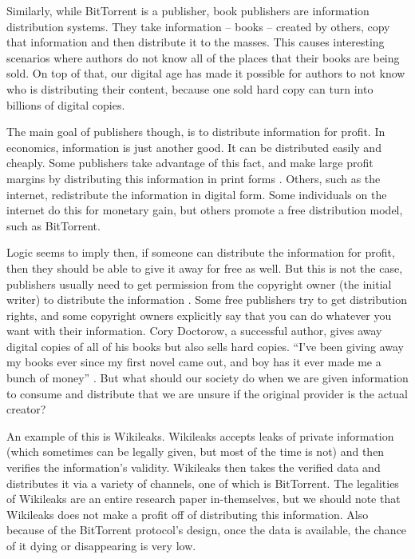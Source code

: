 \documentclass[11pt]{article}
\begin{document}
\begin{multicols}{2}
Similarly, while BitTorrent is a publisher, book publishers are information distribution systems. They take information -- books -- created by others, copy that information and then distribute it to the masses. This causes interesting scenarios where authors do not know all of the places that their books are being sold. On top of that, our digital age has made it possible for authors to not know who is distributing their content, because one sold hard copy can turn into billions of digital copies.

The main goal of publishers though, is to distribute information for profit. In economics, information is just another good. It can be distributed easily and cheaply. Some publishers take advantage of this fact, and make large profit margins by distributing this information in print forms \cite{PSO}. Others, such as the internet, redistribute the information in digital form. Some individuals on the internet do this for monetary gain, but others promote a free distribution model, such as BitTorrent. 

Logic seems to imply then, if someone can distribute the information for profit, then they should be able to give it away for free as well. But this is not the case, publishers usually need to get permission from the copyright owner (the initial writer) to distribute the information \cite{t17c1s106}. Some free publishers try to get distribution rights, and some copyright owners explicitly say that you can do whatever you want with their information. Cory Doctorow, a successful author, gives away digital copies of all of his books but also sells hard copies. ``I've been giving away my books ever since my first novel came out, and boy has it ever made me a bunch of money'' \cite{doctorow}. But what should our society do when we are given information to consume and distribute that we are unsure if the original provider is the actual creator?

An example of this is Wikileaks. Wikileaks accepts leaks of private information (which sometimes can be legally given, but most of the time is not) and then verifies the information's validity. Wikileaks then takes the verified data and distributes it via a variety of channels, one of which is BitTorrent. The legalities of Wikileaks are an entire research paper in-themselves, but we should note that Wikileaks does not make a profit off of distributing this information. Also because of the BitTorrent protocol's design, once the data is available, the chance of it dying or disappearing is very low.


\end{multicols}
\end{document}
